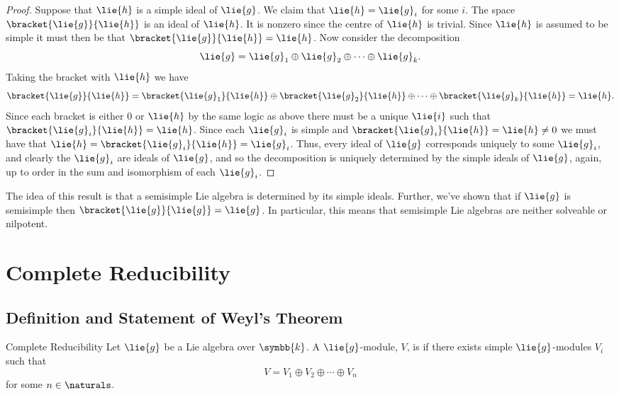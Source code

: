 \documentclass[fleqn]{NotesClass}
\renewcommand{\field}{\symbb{k}}
\begin{document}
\begin{thm}{}{}
\begin{proof}
            Suppose that \(\lie{h}\) is a simple ideal of \(\lie{g}\).
            We claim that \(\lie{h} = \lie{g}_i\) for some \(i\).
            The space \(\bracket{\lie{g}}{\lie{h}}\) is an ideal of \(\lie{h}\).
            It is nonzero since the centre of \(\lie{h}\) is trivial.
            Since \(\lie{h}\) is assumed to be simple it must then be that \(\bracket{\lie{g}}{\lie{h}} = \lie{h}\).
            Now consider the decomposition
            \begin{equation}
                \lie{g} = \lie{g}_1 \oplus \lie{g}_2 \oplus \dotsb \oplus \lie{g}_k.
            \end{equation}
            Taking the bracket with \(\lie{h}\) we have
            \begin{equation}
                \bracket{\lie{g}}{\lie{h}} = \bracket{\lie{g}_1}{\lie{h}} \oplus \bracket{\lie{g}_2}{\lie{h}} \oplus \dotsb \oplus \bracket{\lie{g}_k}{\lie{h}} = \lie{h}.
            \end{equation}
            Since each bracket is either \(0\) or \(\lie{h}\) by the same logic as above there must be a unique \(\lie{i}\) such that \(\bracket{\lie{g}_i}{\lie{h}} = \lie{h}\).
            Since each \(\lie{g}_i\) is simple and \(\bracket{\lie{g}_i}{\lie{h}} = \lie{h} \ne 0\) we must have that \(\lie{h} = \bracket{\lie{g}_i}{\lie{h}} = \lie{g}_i\).
            Thus, every ideal of \(\lie{g}\) corresponds uniquely to some \(\lie{g}_i\), and clearly the \(\lie{g}_i\) are ideals of \(\lie{g}\), and so the decomposition is uniquely determined by the simple ideals of \(\lie{g}\), again, up to order in the sum and isomorphism of each \(\lie{g}_i\).
        \end{proof}
    \end{thm}
    
    The idea of this result is that a semisimple Lie algebra is determined by its simple ideals.
    Further, we've shown that if \(\lie{g}\) is semisimple then \(\bracket{\lie{g}}{\lie{g}} = \lie{g}\).
    In particular, this means that semisimple Lie algebras are neither solveable or nilpotent.
    
    \chapter{Complete Reducibility}
    \section{Definition and Statement of Weyl's Theorem}
    \begin{dfn}{Complete Reducibility}{}
        Let \(\lie{g}\) be a Lie algebra over \(\field\).
        A \(\lie{g}\)-module, \(V\), is  if there exists simple \(\lie{g}\)-modules \(V_i\) such that
        \begin{equation}
            V = V_1 \oplus V_2 \oplus \dotsb \oplus V_n
        \end{equation}
        for some \(n \in \naturals\).
    \end{dfn}
    
\end{document}
